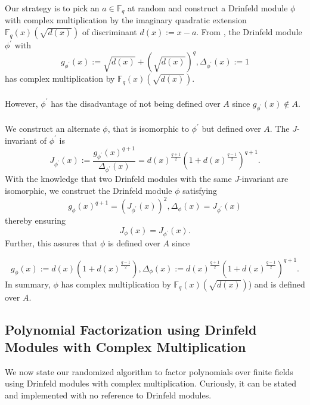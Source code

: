 \documentclass{article}
\theoremstyle{plain}
\theoremstyle{definition}
\def\F{\ensuremath{\mathbb{F}}}
\newcommand{\D}{\Delta}
\begin{document}
Our strategy is to pick an $a \in \F_q$ at random and construct a Drinfeld module $\phi$ with complex multiplication by the imaginary quadratic extension $\F_q(x)(\sqrt{d(x)})$ of discriminant $d(x):=x-a$. From \cite{dor}, the Drinfeld module $\phi^\prime$ with $$g_{\phi^\prime}(x):=\sqrt{d(x)}+\left(\sqrt{d(x)}\right)^q, \D_{\phi^\prime}(x) := 1$$ has complex multiplication by $\F_q(x)(\sqrt{d(x)})$.\\ \\
However, $\phi^\prime$ has the disadvantage of not being defined over $A$ since $g_{\phi^\prime}(x) \notin A$.\\ \\
We construct an alternate $\phi$, that is isomorphic to $\phi^\prime$ but defined over $A$. The $J$-invariant \cite{gek} of $\phi^\prime$ is $$J_{\phi^\prime}(x) := \frac{g_{\phi^\prime}(x)^{q+1}}{\D_{\phi^\prime}(x)} = d(x)^{\frac{q+1}{2}}\left(1+d(x)^{\frac{q-1}{2}}\right)^{q+1}.$$
With the knowledge that two Drinfeld modules with the same $J$-invariant are isomorphic, we construct the Drinfeld module $\phi$ satisfying $$g_\phi(x)^{q+1} = (J_{\phi^\prime}(x))^2, \D_{\phi}(x)= J_{\phi^\prime}(x)$$ thereby ensuring $$J_{\phi}(x)=J_{\phi^\prime}(x).$$ Further, this assures that $\phi$ is defined over $A$ since

$$g_\phi(x):=d(x)(1+d(x)^{\frac{q-1}{2}}),\D_\phi(x):=d(x)^{\frac{q+1}{2}}(1+d(x)^{\frac{q-1}{2}})^{q+1}.$$
In summary, $\phi$ has complex multiplication by $\F_q(x)(\sqrt{d(x)})$) and is defined over $A$.
\subsection{Polynomial Factorization using Drinfeld Modules with Complex Multiplication}
We now state our randomized algorithm to factor polynomials over finite fields using Drinfeld modules with complex multiplication. Curiously, it can be stated and implemented with no reference to Drinfeld modules.
\end{document}
